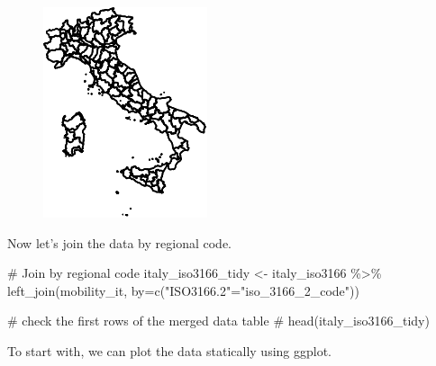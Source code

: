 \documentclass[
  letterpaper,
  DIV=11,
  numbers=noendperiod]{scrreprt}
\newenvironment{Shaded}{\begin{snugshade}}{\end{snugshade}}
\newcommand{\AttributeTok}[1]{\textcolor[rgb]{0.40,0.45,0.13}{#1}}
\newcommand{\CommentTok}[1]{\textcolor[rgb]{0.37,0.37,0.37}{#1}}
\newcommand{\FunctionTok}[1]{\textcolor[rgb]{0.28,0.35,0.67}{#1}}
\newcommand{\NormalTok}[1]{\textcolor[rgb]{0.00,0.23,0.31}{#1}}
\newcommand{\OtherTok}[1]{\textcolor[rgb]{0.00,0.23,0.31}{#1}}
\newcommand{\SpecialCharTok}[1]{\textcolor[rgb]{0.37,0.37,0.37}{#1}}
\newcommand{\StringTok}[1]{\textcolor[rgb]{0.13,0.47,0.30}{#1}}
\begin{document}
\begin{figure}[H]

{\centering \includegraphics{longitudinal-1_files/figure-pdf/unnamed-chunk-17-1.pdf}

}

\end{figure}

Now let's join the data by regional code.

\begin{Shaded}
\begin{Highlighting}[]
\CommentTok{\# Join by regional code}
\NormalTok{italy\_iso3166\_tidy }\OtherTok{\textless{}{-}}\NormalTok{ italy\_iso3166 }\SpecialCharTok{\%\textgreater{}\%}
  \FunctionTok{left\_join}\NormalTok{(mobility\_it, }\AttributeTok{by=}\FunctionTok{c}\NormalTok{(}\StringTok{"ISO3166.2"}\OtherTok{=}\StringTok{"iso\_3166\_2\_code"}\NormalTok{))}

\CommentTok{\# check the first rows of the merged data table}
\CommentTok{\# head(italy\_iso3166\_tidy)}
\end{Highlighting}
\end{Shaded}

To start with, we can plot the data statically using ggplot.
\end{document}

